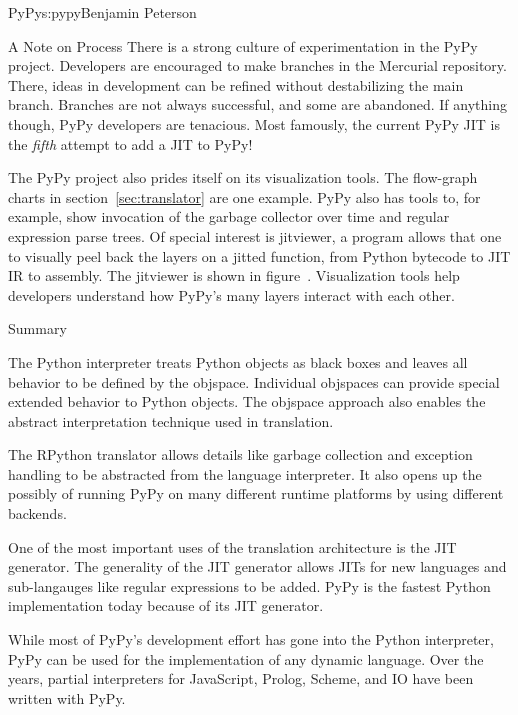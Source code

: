 \begin{aosachapter}{PyPy}{s:pypy}{Benjamin Peterson}
\begin{aosasect1}{A Note on Process}
There is a strong culture of experimentation in the PyPy project. Developers are
encouraged to make branches in the Mercurial repository. There, ideas in
development can be refined without destabilizing the main branch. Branches are
not always successful, and some are abandoned. If anything though, PyPy
developers are tenacious. Most famously, the current PyPy JIT is the
\emph{fifth} attempt to add a JIT to PyPy!

The PyPy project also prides itself on its visualization tools. The flow-graph
charts in section~\ref{sec:translator} are one example. PyPy also has tools to,
for example, show invocation of the garbage collector over time and regular
expression parse trees. Of special interest is jitviewer, a program allows that
one to visually peel back the layers on a jitted function, from Python bytecode
to JIT IR to assembly. The jitviewer is shown in
figure~. Visualization tools help developers
understand how PyPy's many layers interact with each other.


\end{aosasect1}

\begin{aosasect1}{Summary}

The Python interpreter treats Python objects as black boxes and leaves all
behavior to be defined by the objspace. Individual objspaces can provide special
extended behavior to Python objects. The objspace approach also enables the
abstract interpretation technique used in translation.

The RPython translator allows details like garbage collection and exception
handling to be abstracted from the language interpreter. It also opens up the
possibly of running PyPy on many different runtime platforms by using different
backends.

One of the most important uses of the translation architecture is the JIT
generator. The generality of the JIT generator allows JITs for new languages and
sub-langauges like regular expressions to be added. PyPy is the fastest Python
implementation today because of its JIT generator.

While most of PyPy's development effort has gone into the Python interpreter,
PyPy can be used for the implementation of any dynamic language. Over the years,
partial interpreters for JavaScript, Prolog, Scheme, and IO have been written
with PyPy.


\end{aosasect1}
\end{aosachapter}
